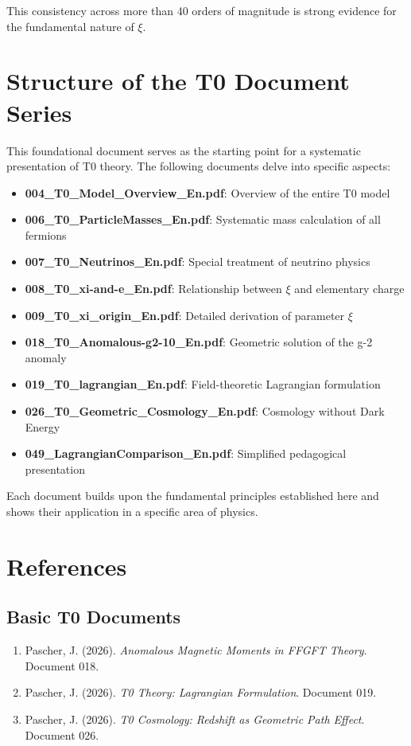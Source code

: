 \documentclass[12pt,a4paper]{article}
\begin{document}
	This consistency across more than 40 orders of magnitude is strong evidence for the fundamental nature of $\xi$.
	
	\section{Structure of the T0 Document Series}
	
	This foundational document serves as the starting point for a systematic presentation of T0 theory. The following documents delve into specific aspects:
	
	\begin{itemize}
		\item \textbf{004\_T0\_Model\_Overview\_En.pdf}: Overview of the entire T0 model
		\item \textbf{006\_T0\_ParticleMasses\_En.pdf}: Systematic mass calculation of all fermions
		\item \textbf{007\_T0\_Neutrinos\_En.pdf}: Special treatment of neutrino physics
		\item \textbf{008\_T0\_xi-and-e\_En.pdf}: Relationship between $\xi$ and elementary charge
		\item \textbf{009\_T0\_xi\_origin\_En.pdf}: Detailed derivation of parameter $\xi$
		\item \textbf{018\_T0\_Anomalous-g2-10\_En.pdf}: Geometric solution of the g-2 anomaly
		\item \textbf{019\_T0\_lagrangian\_En.pdf}: Field-theoretic Lagrangian formulation
		\item \textbf{026\_T0\_Geometric\_Cosmology\_En.pdf}: Cosmology without Dark Energy
		\item \textbf{049\_LagrangianComparison\_En.pdf}: Simplified pedagogical presentation
	\end{itemize}
	
	Each document builds upon the fundamental principles established here and shows their application in a specific area of physics.
	
	\section{References}
	
	\subsection{Basic T0 Documents}
	
	\begin{enumerate}
		\item Pascher, J. (2026). \textit{Anomalous Magnetic Moments in FFGFT Theory}. Document 018.
		\item Pascher, J. (2026). \textit{T0 Theory: Lagrangian Formulation}. Document 019.
		\item Pascher, J. (2026). \textit{T0 Cosmology: Redshift as Geometric Path Effect}. Document 026.
	\end{enumerate}
	
\end{document}
